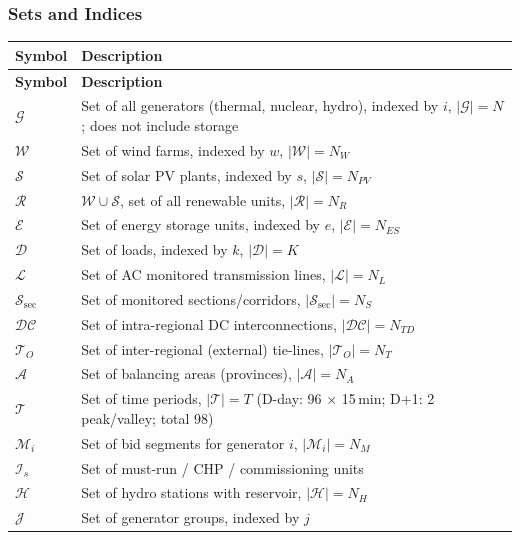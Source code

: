 \subsubsection{Sets and Indices}

\begin{longtable}{lL{10.5cm}}
\toprule
\textbf{Symbol} & \textbf{Description} \\
\midrule
\endfirsthead
\toprule
\textbf{Symbol} & \textbf{Description} \\
\midrule
\endhead
$\mathcal{G}$       & Set of all generators (thermal, nuclear, hydro), indexed by $i$, $|\mathcal{G}|=N$; does not include storage \\
$\mathcal{W}$       & Set of wind farms, indexed by $w$, $|\mathcal{W}|=N_W$ \\
$\mathcal{S}$       & Set of solar PV plants, indexed by $s$, $|\mathcal{S}|=N_{PV}$ \\
$\mathcal{R}$       & $\mathcal{W} \cup \mathcal{S}$, set of all renewable units, $|\mathcal{R}|=N_R$ \\
$\mathcal{E}$       & Set of energy storage units, indexed by $e$, $|\mathcal{E}|=N_{ES}$ \\
$\mathcal{D}$       & Set of loads, indexed by $k$, $|\mathcal{D}|=K$ \\
$\mathcal{L}$       & Set of AC monitored transmission lines, $|\mathcal{L}|=N_L$ \\
$\mathcal{S}_{\mathrm{sec}}$ & Set of monitored sections/corridors, $|\mathcal{S}_{\mathrm{sec}}|=N_S$ \\
$\mathcal{DC}$      & Set of intra-regional DC interconnections, $|\mathcal{DC}|=N_{TD}$ \\
$\mathcal{T}_{O}$   & Set of inter-regional (external) tie-lines, $|\mathcal{T}_{O}|=N_T$ \\
$\mathcal{A}$       & Set of balancing areas (provinces), $|\mathcal{A}|=N_A$ \\
$\mathcal{T}$       & Set of time periods, $|\mathcal{T}|=T$ (D-day: 96 $\times$ 15\,min; D+1: 2 peak/valley; total 98) \\
$\mathcal{M}_i$     & Set of bid segments for generator $i$, $|\mathcal{M}_i|=N_M$ \\
$\mathcal{I}_s$     & Set of must-run / CHP / commissioning units \\
$\mathcal{H}$       & Set of hydro stations with reservoir, $|\mathcal{H}|=N_H$ \\
$\mathcal{J}$       & Set of generator groups, indexed by $j$ \\
\bottomrule
\end{longtable}

